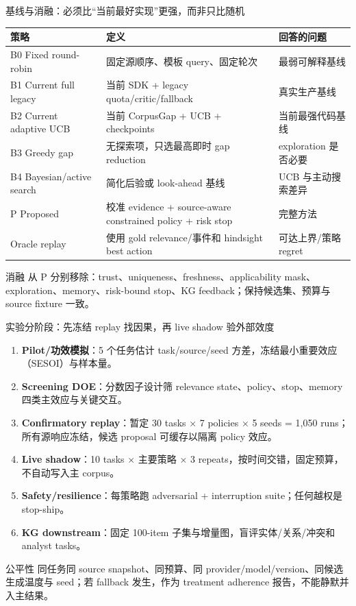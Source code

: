 \begin{frame}{基线与消融：必须比“当前最好实现”更强，而非只比随机}
\scriptsize
\begin{tabularx}{\textwidth}{p{} X p{}}
\toprule
策略 & 定义 & 回答的问题 \\
\midrule
B0 Fixed round-robin & 固定源顺序、模板 query、固定轮次 & 最弱可解释基线 \\
B1 Current full legacy & 当前 SDK + legacy quota/critic/fallback & 真实生产基线 \\
B2 Current adaptive UCB & 当前 CorpusGap + UCB + checkpoints & 当前最强代码基线 \\
B3 Greedy gap & 无探索项，只选最高即时 gap reduction & exploration 是否必要 \\
B4 Bayesian/active search & 简化后验或 look-ahead 基线 & UCB 与主动搜索差异 \\
P Proposed & 校准 evidence + source-aware constrained policy + risk stop & 完整方法 \\
Oracle replay & 使用 gold relevance/事件和 hindsight best action & 可达上界/策略 regret \\
\bottomrule
\end{tabularx}

\vspace{0.5em}
\begin{block}{消融}
从 P 分别移除：trust、uniqueness、freshness、applicability mask、exploration、memory、risk-bound stop、KG feedback；保持候选集、预算与 source fixture 一致。
\end{block}
\end{frame}

\begin{frame}{实验分阶段：先冻结 replay 找因果，再 live shadow 验外部效度}
\begin{enumerate}
  \item \textbf{Pilot/功效模拟}：5 个任务估计 task/source/seed 方差，冻结最小重要效应（SESOI）与样本量。
  \item \textbf{Screening DOE}：分数因子设计筛 relevance state、policy、stop、memory 四类主效应与关键交互。
  \item \textbf{Confirmatory replay}：暂定 30 tasks × 7 policies × 5 seeds = 1,050 runs；所有源响应冻结，候选 proposal 可缓存以隔离 policy 效应。
  \item \textbf{Live shadow}：10 tasks × 主要策略 × 3 repeats，按时间交错，固定预算，不自动写入主 corpus。
  \item \textbf{Safety/resilience}：每策略跑 adversarial + interruption suite；任何越权是 stop-ship。
  \item \textbf{KG downstream}：固定 100-item 子集与增量图，盲评实体/关系/冲突和 analyst tasks。
\end{enumerate}

\begin{alertblock}{公平性}
同任务同 source snapshot、同预算、同 provider/model/version、同候选生成温度与 seed；若 fallback 发生，作为 treatment adherence 报告，不能静默并入主结果。
\end{alertblock}
\end{frame}

